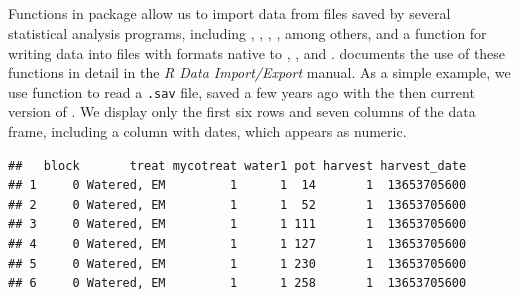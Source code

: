\documentclass[krantz2]{krantz}\usepackage{knitr}
\begin{document}
\subsection[foreign]{}



Functions in package  allow us to import data from files saved by several statistical analysis programs, including , , , ,  among others, and a function for writing data into files with formats native to , , and . \Rlang documents the use of these functions in detail in the \emph{R Data Import/Export} manual. As a simple example, we use function  to read a \texttt{.sav} file, saved a few years ago with the then current version of . We display only the first six rows and seven columns of the data frame, including a column with dates, which appears as numeric.

\begin{knitrout}\footnotesize
{}\color{fgcolor}\begin{kframe}
\begin{alltt}
 \hlkwb{<-} \hlstd{(} \hlstd{=} \hlstd{,}  \hlstd{=} \hlstd{)}
\end{alltt}


{\ttfamily\noindent\itshape\color{messagecolor}{\#\# re-encoding from UTF-8}}\begin{alltt}
\hlstd{my_spss.df[}\hlopt{:}\hlstd{,} \hlstd{(}\hlopt{:}\hlstd{,} \hlstd{)]}
\end{alltt}
\begin{verbatim}
##   block       treat mycotreat water1 pot harvest harvest_date
## 1     0 Watered, EM         1      1  14       1  13653705600
## 2     0 Watered, EM         1      1  52       1  13653705600
## 3     0 Watered, EM         1      1 111       1  13653705600
## 4     0 Watered, EM         1      1 127       1  13653705600
## 5     0 Watered, EM         1      1 230       1  13653705600
## 6     0 Watered, EM         1      1 258       1  13653705600
\end{verbatim}
\end{kframe}
\end{knitrout}
\end{document}
